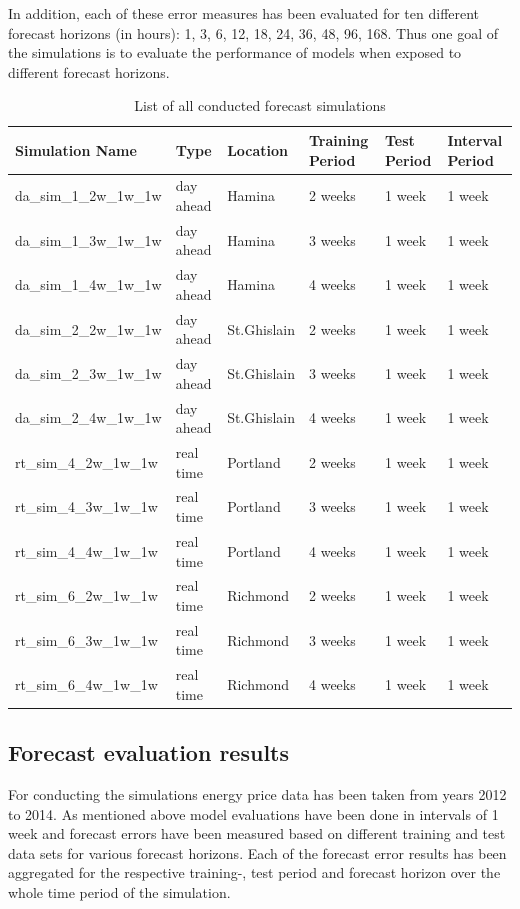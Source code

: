 In addition, each of these error measures has been evaluated for ten different forecast horizons (in hours): 
1, 3, 6, 12, 18, 24, 36, 48, 96, 168. Thus one goal of the simulations is to evaluate the performance of models when exposed to 
different forecast horizons. 

\begin{table}[ht]
\centering
\begin{tabular}{llllll}
  \hline
 Simulation Name &  Type & Location & Training Period & Test Period & Interval Period \\
  \hline
	da\_sim\_1\_2w\_1w\_1w & day ahead & Hamina & 2 weeks & 1 week & 1 week \\
	da\_sim\_1\_3w\_1w\_1w & day ahead & Hamina & 3 weeks & 1 week & 1 week \\
	da\_sim\_1\_4w\_1w\_1w & day ahead & Hamina & 4 weeks & 1 week & 1 week \\
	\hline
	da\_sim\_2\_2w\_1w\_1w & day ahead & St.Ghislain & 2 weeks & 1 week & 1 week \\
	da\_sim\_2\_3w\_1w\_1w & day ahead & St.Ghislain & 3 weeks & 1 week & 1 week \\
	da\_sim\_2\_4w\_1w\_1w & day ahead & St.Ghislain & 4 weeks & 1 week & 1 week \\
	\hline
	rt\_sim\_4\_2w\_1w\_1w & real time & Portland & 2 weeks & 1 week & 1 week \\
	rt\_sim\_4\_3w\_1w\_1w & real time & Portland & 3 weeks & 1 week & 1 week \\
	rt\_sim\_4\_4w\_1w\_1w & real time & Portland & 4 weeks & 1 week & 1 week \\
	\hline
	rt\_sim\_6\_2w\_1w\_1w & real time & Richmond & 2 weeks & 1 week & 1 week \\
	rt\_sim\_6\_3w\_1w\_1w & real time & Richmond & 3 weeks & 1 week & 1 week \\
	rt\_sim\_6\_4w\_1w\_1w & real time & Richmond & 4 weeks & 1 week & 1 week \\
   \hline
\end{tabular}
\caption{List of all conducted forecast simulations}
\label{tab:list_of_conducted_forecast_simulations}
\end{table}




\subsection{Forecast evaluation results}

For conducting the simulations energy price data has been taken from years 2012 to 2014. As mentioned above model evaluations have been done in intervals of 1 week and forecast errors have been measured based on different training and test data sets for various forecast horizons. Each of the forecast error results has been aggregated for the respective training-, test period and forecast horizon over the whole time period of the simulation. 


